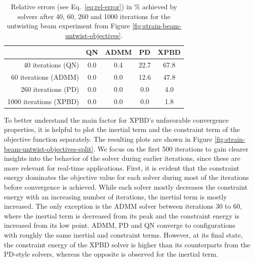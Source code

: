 \begin{table}[t]
\centering
\begin{tabular}{ |r||c|c|c|c| } 
 \hline
 & QN & ADMM & PD & XPBD\\
 \hline
 \hline
    40 iterations (QN) & 0.0 & 0.4 & 22.7 & 67.8 \\ 
    60 iterations (ADMM) & 0.0 & 0.0 & 12.6 & 47.8 \\
    260 iterations (PD) & 0.0 & 0.0 & 0.0 & 4.0 \\
    1000 iterations (XPBD) & 0.0 & 0.0 & 0.0 & 1.8 \\ 
 \hline
\end{tabular}
\caption{Relative errors (see Eq.\ \ref{eq:rel-error}) in \% achieved by solvers after 40, 60, 260 and 1000 iterations for the untwisting beam experiment from 
Figure \ref{fig:strain-beam-untwist-objectives}.}
\label{tbl:rel-errors}
\end{table}

To better understand the main factor for XPBD's unfavorable convergence properties, it is helpful to plot the inertial term and the constraint term of the objective 
function separately. The resulting plots are shown in Figure \ref{fig:strain-beam-untwist-objectives-split}. 
We focus on the first 500 iterations to gain clearer insights into the behavior of the solver during earlier iterations, since these are more relevant for 
real-time applications. First, it is evident that the constraint energy dominates the objective value for each solver during most of the iterations before 
convergence is achieved. While each solver mostly decreases the constraint energy with an increasing number of iterations, the inertial term is mostly increased. 
The only exception is the ADMM solver between iterations 30 to 60, where the inertial term is decreased from its peak and the constraint energy is increased from its 
low point. ADMM, PD and QN converge to configurations with roughly the same inertial and constraint terms. However, at its final state, the constraint 
energy of the XPBD solver is higher than its counterparts from the PD-style solvers, whereas the opposite is observed for the inertial term. 

